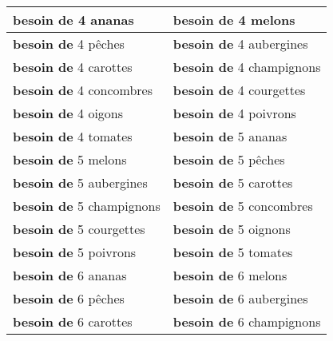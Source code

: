 \documentclass{article}
\date{}
\newcommand{\tabrowEnd}{\rule{0pt}{35pt}\\}
\begin{document}
  \centering
  \noindent
  {\LARGE
    \begin{tabular}{| p{} | p{} |}
      \hline
      \textbf{besoin de} 4 ananas      & \textbf{besoin de} 4 melons \tabrowEnd
      \hline
      \textbf{besoin de} 4 pêches      & \textbf{besoin de} 4 aubergines \tabrowEnd
      \hline
      \textbf{besoin de} 4 carottes    & \textbf{besoin de} 4 champignons \tabrowEnd
      \hline
      \textbf{besoin de} 4 concombres  & \textbf{besoin de} 4 courgettes \tabrowEnd
      \hline
      \textbf{besoin de} 4 oigons      & \textbf{besoin de} 4 poivrons \tabrowEnd
      \hline
      \textbf{besoin de} 4 tomates     & \textbf{besoin de} 5 ananas \tabrowEnd
      \hline
      \textbf{besoin de} 5 melons      & \textbf{besoin de} 5 pêches \tabrowEnd
      \hline
      \textbf{besoin de} 5 aubergines  & \textbf{besoin de} 5 carottes \tabrowEnd
      \hline
      \textbf{besoin de} 5 champignons & \textbf{besoin de} 5 concombres \tabrowEnd
      \hline
      \textbf{besoin de} 5 courgettes  & \textbf{besoin de} 5 oignons \tabrowEnd
      \hline
      \textbf{besoin de} 5 poivrons    & \textbf{besoin de} 5 tomates \tabrowEnd
      \hline
      \textbf{besoin de} 6 ananas      & \textbf{besoin de} 6 melons \tabrowEnd
      \hline
      \textbf{besoin de} 6 pêches      & \textbf{besoin de} 6 aubergines \tabrowEnd
      \hline
      \textbf{besoin de} 6 carottes    & \textbf{besoin de} 6 champignons \tabrowEnd
      \hline
    \end{tabular}
  }
\end{document}
